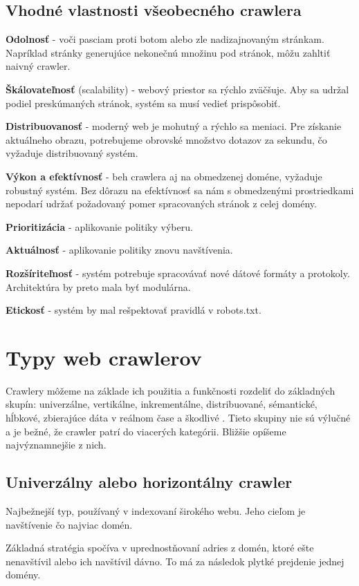 \subsection{Vhodné vlastnosti všeobecného crawlera}

\textbf{Odolnosť} - voči pasciam proti botom alebo zle nadizajnovaným stránkam. Napríklad stránky generujúce nekonečnú množinu pod stránok, môžu zahltiť naivný crawler. 

\textbf{Škálovateľnosť} (scalability) - webový priestor sa rýchlo zväčšuje. Aby sa udržal podiel preskúmaných stránok, systém sa musí 
vedieť prispôsobiť. 

\textbf{Distribuovanosť} -  moderný web je mohutný a rýchlo sa meniaci. Pre získanie aktuálneho obrazu, potrebujeme obrovské množstvo dotazov za sekundu, čo vyžaduje distribuovaný systém. 

\textbf{Výkon a efektívnosť} - beh crawlera aj na obmedzenej doméne, vyžaduje robustný systém. Bez dôrazu na efektívnosť sa nám s obmedzenými prostriedkami nepodarí udržať požadovaný pomer spracovaných stránok z celej domény.

\textbf{Prioritizácia} - aplikovanie politiky výberu.

\textbf{Aktuálnosť} - aplikovanie politiky znovu navštívenia.

\textbf{Rozšíriteľnosť} - systém potrebuje spracovávať nové dátové formáty a protokoly. Architektúra by preto mala byť modulárna. 

\textbf{Etickosť} - systém by mal rešpektovať pravidlá v robots.txt.

\section{Typy web crawlerov}
Crawlery môžeme na základe ich použitia a funkčnosti rozdeliť do základných skupín: univerzálne, vertikálne, inkrementálne, distribuované, sémantické, hĺbkové, zbierajúce dáta v reálnom čase a škodlivé \cite{studyOfCrawlTypes}. Tieto skupiny nie sú výlučné a je bežné, že crawler patrí do viacerých kategórii. Bližšie opíšeme najvýznamnejšie z nich. 

\subsection{Univerzálny alebo horizontálny crawler}
Najbežnejší typ, používaný v indexovaní širokého webu. Jeho cieľom je navštívenie čo najviac domén.

Základná stratégia spočíva v uprednostňovaní adries z domén, ktoré ešte nenavštívil alebo ich navštívil dávno. To má za následok plytké prejdenie jednej domény. 

